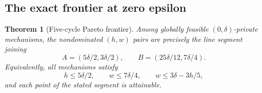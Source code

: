\documentclass[sigconf,nonacm]{aamas}
\newtheorem{theorem}{Theorem}
\begin{document}
\subsection{The exact frontier at zero epsilon}
\begin{theorem}[Five-cycle Pareto frontier]\label{thm:frontier}
Among globally feasible $(0,\delta)$-private mechanisms, the nondominated $(h,w)$ pairs are precisely the line segment joining
\begin{equation}\label{eq:endpoints}
 A=(5\delta/2,3\delta/2),\qquad
 B=(25\delta/12,7\delta/4).
\end{equation}
Equivalently, all mechanisms satisfy
\begin{equation}\label{eq:frontier-bounds}
 h\leq5\delta/2,\qquad
 w\leq7\delta/4,\qquad
 w\leq3\delta-3h/5,
\end{equation}
and each point of the stated segment is attainable.
\end{theorem}
\end{document}
